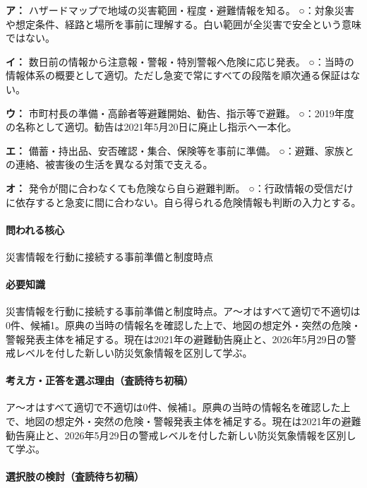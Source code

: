 \noindent\textbf{ア：} ハザードマップで地域の災害範囲・程度・避難情報を知る。 ○：対象災害や想定条件、経路と場所を事前に理解する。白い範囲が全災害で安全という意味ではない。\par

\noindent\textbf{イ：} 数日前の情報から注意報・警報・特別警報へ危険に応じ発表。 ○：当時の情報体系の概要として適切。ただし急変で常にすべての段階を順次通る保証はない。\par

\noindent\textbf{ウ：} 市町村長の準備・高齢者等避難開始、勧告、指示等で避難。 ○：2019年度の名称として適切。勧告は2021年5月20日に廃止し指示へ一本化。\par

\noindent\textbf{エ：} 備蓄・持出品、安否確認・集合、保険等を事前に準備。 ○：避難、家族との連絡、被害後の生活を異なる対策で支える。\par

\noindent\textbf{オ：} 発令が間に合わなくても危険なら自ら避難判断。 ○：行政情報の受信だけに依存すると急変に間に合わない。自ら得られる危険情報も判断の入力とする。\par

\paragraph{問われる核心} 災害情報を行動に接続する事前準備と制度時点

\paragraph{必要知識} 災害情報を行動に接続する事前準備と制度時点。ア〜オはすべて適切で不適切は0件、候補1。原典の当時の情報名を確認した上で、地図の想定外・突然の危険・警報発表主体を補足する。現在は2021年の避難勧告廃止と、2026年5月29日の警戒レベルを付した新しい防災気象情報を区別して学ぶ。

\paragraph{考え方・正答を選ぶ理由（査読待ち初稿）} ア〜オはすべて適切で不適切は0件、候補1。原典の当時の情報名を確認した上で、地図の想定外・突然の危険・警報発表主体を補足する。現在は2021年の避難勧告廃止と、2026年5月29日の警戒レベルを付した新しい防災気象情報を区別して学ぶ。

\paragraph{選択肢の検討（査読待ち初稿）}\mbox{}\par

